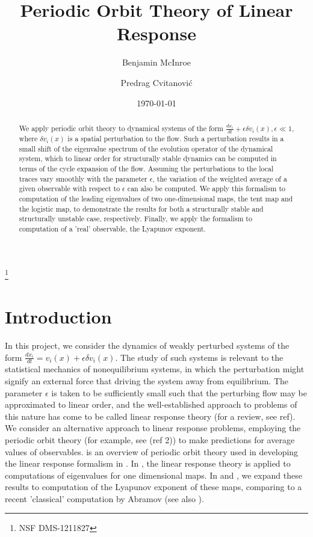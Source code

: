 \documentclass[aps,pre,
                showpacs,
                twocolumn,
                groupedaddress,
                floatfix]{revtex4-1}
\begin{document}
\title{Periodic Orbit Theory of Linear Response}
\author{Benjamin McInroe}
\author{Predrag Cvitanovi\'c}
\thanks{NSF DMS-1211827}

\date{\today}

\begin{abstract}
We apply periodic orbit theory to dynamical systems of
the form $\frac{dx_{i}}{dt}+\epsilon \delta v_{i}(x), \epsilon \ll 1$,
where $\delta v_{i}(x)$ is a spatial perturbation to the flow. Such a
perturbation results in a small shift of the eigenvalue spectrum of the
evolution operator of the dynamical system, which to linear order for
structurally stable dynamics can be computed in terms of the cycle
expansion of the flow. Assuming the perturbations to the local traces
vary smoothly with the parameter $\epsilon$, the variation of the
weighted average of a given observable with respect to $\epsilon$ can
also be computed. We apply this formalism to computation of the leading
eigenvalues of two one-dimensional maps, the tent map and the logistic
map, to demonstrate the results for both a structurally stable and
structurally unstable case, respectively. Finally, we apply the formalism
to computation of a 'real' observable, the Lyapunov exponent.
\end{abstract}

\maketitle



\section{Introduction}
\label{sect:intro}

In this project, we consider the dynamics of weakly perturbed systems of
the form $\frac{dx_{i}}{dt}=v_{i}(x) + \epsilon \delta v_{i}(x)$. The
study of such systems is relevant to the statistical mechanics of
nonequilibrium systems, in which the perturbation might signify an
external force that driving the system away from equilibrium. The
parameter $\epsilon$ is taken to be sufficiently small such that the
perturbing flow may be approximated to linear order, and the
well-established approach to problems of this nature has come to be
called linear response theory (for a review, see ref). We consider an
alternative approach to linear response problems, employing the periodic
orbit theory (for example, see (ref 2)) to make predictions for average
values of observables.   is an overview of periodic orbit
theory used in developing the linear response formalism in
. In , the linear response
theory is applied to computations of eigenvalues for one dimensional
maps. In  and , we expand these
results to computation of the Lyapunov exponent of these maps, comparing
to a recent 'classical' computation by Abramov (see also
).
\end{document}
